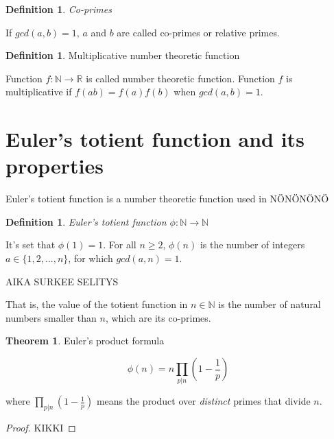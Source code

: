 \documentclass{article}
\theoremstyle{definition}
\newtheorem{definition}[subsection]{Definition}
\newtheorem{theorem}[subsection]{Theorem}
\begin{document}
\begin{definition}{\emph{Co-primes}}

If $gcd(a,b) = 1$, $a$ and $b$ are called co-primes or relative primes.

\end{definition}

\begin{definition}{Multiplicative number theoretic function}

Function $f: \mathbb{N} \rightarrow \mathbb{R}$ is called number theoretic function. Function $f$ is multiplicative if $f(ab) = f(a)f(b)$ when $gcd(a, b)=1$.

\end{definition}

\section{Euler's totient function and its properties}

Euler's totient function is a number theoretic function used in NÖNÖNÖNÖ

\begin{definition}{\emph{Euler's totient function $\phi: \mathbb{N} \rightarrow \mathbb{N}$}}

It's set that $\phi(1) = 1$. For all $n \geq 2$, $\phi(n)$ is the number of integers $a \in \{1,2,...,n\}$, for which $gcd(a,n) = 1$.

AIKA SURKEE SELITYS

That is, the value of the totient function in $n \in \mathbb{N}$ is the number of natural numbers smaller than $n$, which are its co-primes.


\end{definition}

\newpage

\begin{theorem}{Euler's product formula}

\begin{equation*}
    \phi(n) = n \prod_{p \vert n} (1 - \frac{1}{p})
\end{equation*}

where $\prod_{p \vert n} (1 - \frac{1}{p})$ means the product over \emph{distinct} primes that divide $n$.

\begin{proof}

KIKKI

\end{proof}

\end{theorem}
\end{document}
